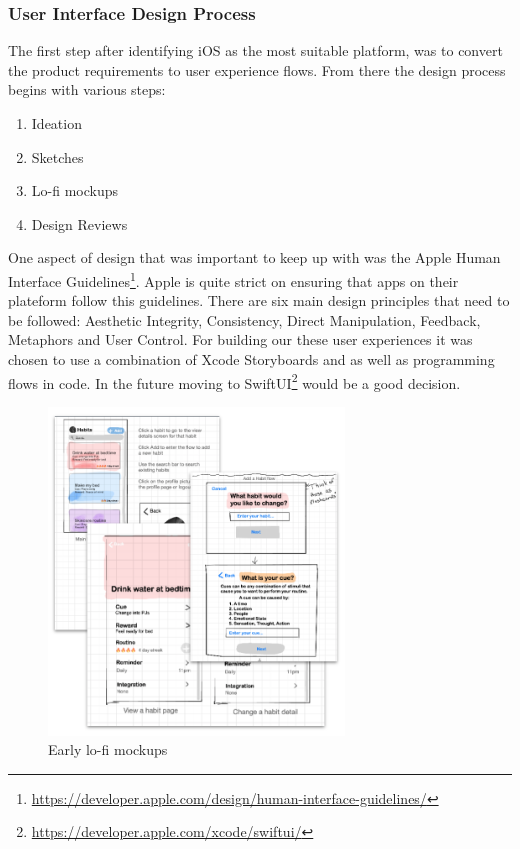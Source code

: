 \subsubsection{User Interface Design Process}
The first step after identifying iOS as the most suitable platform, was to convert the product requirements to user experience flows. From there the design process begins with various steps:
\begin{enumerate}
    \item Ideation
    \item Sketches
    \item Lo-fi mockups
    \item Design Reviews
\end{enumerate}
One aspect of design that was important to keep up with was the Apple Human Interface Guidelines\footnote{\url{https://developer.apple.com/design/human-interface-guidelines/}}. Apple is quite strict on ensuring that apps on their plateform follow this guidelines. There are six main design principles that need to be followed: Aesthetic Integrity, Consistency, Direct Manipulation, Feedback, Metaphors and User Control.
\newline \newline
For building our these user experiences it was chosen to use a combination of Xcode Storyboards and as well as programming flows in code. In the future moving to SwiftUI\footnote{\url{https://developer.apple.com/xcode/swiftui/}} would be a good decision.
\begin{figure}[h]
\centering
\includegraphics[width=0.7\textwidth]{images/mockups.png}
\caption{Early lo-fi mockups}
\end{figure}
